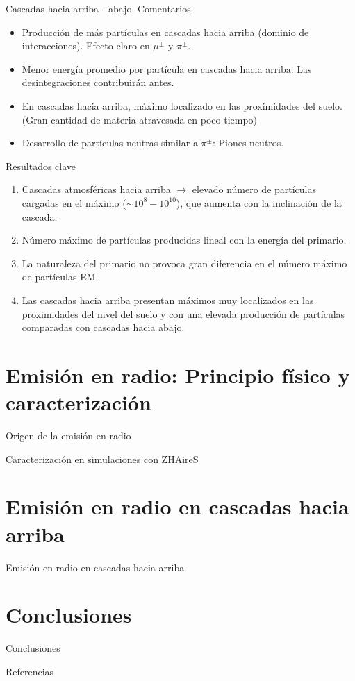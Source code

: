 \documentclass{beamer}
\begin{document}
\begin{frame}{Cascadas hacia arriba - abajo. Comentarios}
	\begin{itemize}
		\item Producción de más partículas en cascadas hacia arriba (dominio de interacciones). Efecto claro en $\mu^\pm$ y $\pi^\pm$.
		\item Menor energía promedio por partícula en cascadas hacia arriba. Las desintegraciones contribuirán antes.
		\item En cascadas hacia arriba, máximo localizado en las proximidades del suelo. (Gran cantidad de materia atravesada en poco tiempo)
		\item Desarrollo de partículas neutras similar a $\pi^\pm$: Piones neutros.
	\end{itemize}
\end{frame}
\begin{frame}{Resultados clave}
	\begin{enumerate}
		\item Cascadas atmosféricas hacia arriba $\rightarrow$ elevado número de partículas cargadas en el máximo ($\sim 10^8-10^{10}$), que aumenta con la inclinación de la cascada. 
	\item Número máximo de partículas producidas lineal con la energía del primario. 
	\item La naturaleza del primario no provoca gran diferencia en el número máximo de partículas EM.
	\item Las cascadas hacia arriba presentan máximos muy localizados en las proximidades del nivel del suelo y con una elevada producción de partículas comparadas con cascadas hacia abajo.
	\end{enumerate}
\end{frame}
	\section{Emisión en radio: Principio físico y caracterización}
	\begin{frame}{Origen de la emisión en radio}
		
	\end{frame}
	\begin{frame}{Caracterización en simulaciones con ZHAireS}
		
	\end{frame}
	\section{Emisión en radio en cascadas hacia arriba}
	\begin{frame}{Emisión en radio en cascadas hacia arriba}
		
	\end{frame}
	\section{Conclusiones}
	\begin{frame}{Conclusiones}

	\end{frame}
	
	\begin{frame}{Referencias}
		\fontsize{9pt}{1}
		\nocite{*}
		
		
	\end{frame}
\end{document}
